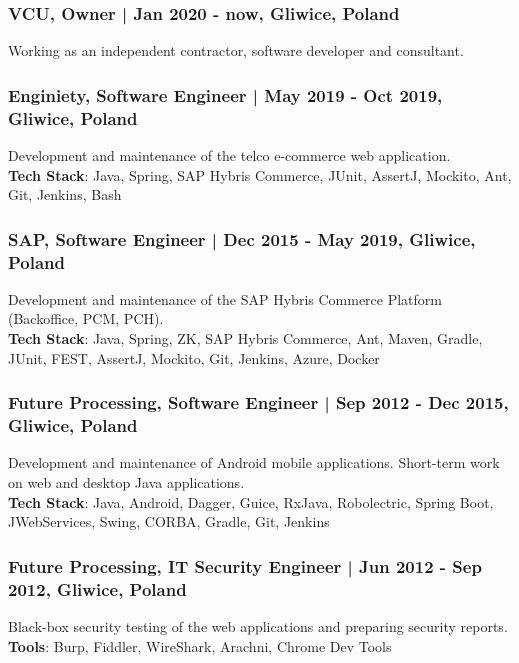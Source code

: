 \documentclass[8pt]{extarticle}
\begin{document}
      \subsubsection*{\normalsize{VCU, Owner | Jan 2020 - now, Gliwice, Poland}}
      Working as an independent contractor, software developer and consultant.

      \subsubsection*{\normalsize{Enginiety, Software Engineer | May 2019 - Oct 2019, Gliwice, Poland}}
      Development and maintenance of the telco e-commerce web application.\\
      \textbf{Tech Stack}: Java, Spring, SAP Hybris Commerce, JUnit, AssertJ, Mockito, Ant, Git, Jenkins, Bash

      \subsubsection*{\normalsize{SAP, Software Engineer | Dec 2015 - May 2019, Gliwice, Poland}}
      Development and maintenance of the SAP Hybris Commerce Platform (Backoffice, PCM, PCH).\\
      \textbf{Tech Stack}: Java, Spring, ZK, SAP Hybris Commerce, Ant, Maven, Gradle,
      JUnit, FEST, AssertJ, Mockito, Git, Jenkins, Azure, Docker

      \subsubsection*{\normalsize{Future Processing, Software Engineer | Sep 2012 - Dec 2015, Gliwice, Poland}}
      Development and maintenance of Android mobile applications. Short-term work on web and desktop Java applications.\\
      \textbf{Tech Stack}: Java, Android, Dagger, Guice, RxJava, Robolectric, Spring Boot, JWebServices,
      Swing, CORBA, Gradle, Git, Jenkins

      \subsubsection*{\normalsize{Future Processing, IT Security Engineer | Jun 2012 - Sep 2012, Gliwice, Poland}}
      Black-box security testing of the web applications and preparing security reports.\\
      \textbf{Tools}: Burp, Fiddler, WireShark, Arachni, Chrome Dev Tools
\end{document}
